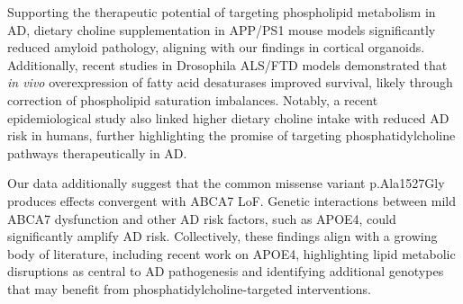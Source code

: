 Supporting the therapeutic potential of targeting phospholipid metabolism in AD, dietary choline supplementation in APP/PS1 mouse models significantly reduced amyloid pathology\supercite{Velazquez2019-da}, aligning with our findings in cortical organoids. Additionally, recent studies in Drosophila ALS/FTD models demonstrated that \textit{in vivo} overexpression of fatty acid desaturases improved survival, likely through correction of phospholipid saturation imbalances\supercite{Giblin2025-ri}. Notably, a recent epidemiological study also linked higher dietary choline intake with reduced AD risk in humans\supercite{Karosas2025-px}, further highlighting the promise of targeting phosphatidylcholine pathways therapeutically in AD.

Our data additionally suggest that the common missense variant p.Ala1527Gly produces effects convergent with ABCA7 LoF. Genetic interactions between mild ABCA7 dysfunction and other AD risk factors, such as APOE4, could significantly amplify AD risk\supercite{Wang2021-oa}. Collectively, these findings align with a growing body of literature, including recent work on APOE4\supercite{Haney2024-fx,Victor2022-tl,Blanchard2022-cf}, highlighting lipid metabolic disruptions as central to AD pathogenesis and identifying additional genotypes that may benefit from phosphatidylcholine-targeted interventions.